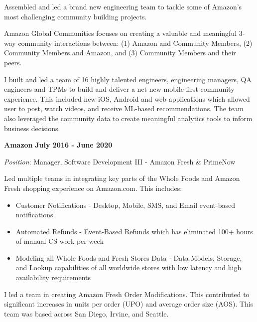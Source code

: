 \documentclass{article}
\begin{document}
Assembled and led a brand new engineering team to tackle some of Amazon's most challenging community building projects.
\vspace{\baselineskip}
\par
Amazon Global Communities focuses on creating a valuable and meaningful 3-way community interactions between: (1) Amazon and Community Members, (2) Community Members and Amazon, and (3) Community Members and their peers.
\vspace{\baselineskip}
\par
I built and led a team of 16 highly talented engineers, engineering managers, QA engineers and TPMs to build and deliver a net-new mobile-first community experience. This included new iOS, Android and web applications which allowed user to post, watch videos, and receive ML-based recommendations. The team also leveraged the community data to create meaningful analytics tools to inform business decisions.
\vspace{\baselineskip}
\par
{\bf Amazon}
\hfill {\bf July 2016 - June 2020}
\vspace{.03in}
\par
{\it Position}: Manager, Software Development III - Amazon Fresh \& PrimeNow\
\vspace{\baselineskip}
\par
Led multiple teams in integrating key parts of the Whole Foods and Amazon Fresh shopping experience on Amazon.com. This includes:
\begin{small}
\begin{itemize}
  \item Customer Notifications - Desktop, Mobile, SMS, and Email event-based notifications
  \item Automated Refunds - Event-Based Refunds which has eliminated 100+ hours of manual CS work per week
  \item Modeling all Whole Foods and Fresh Stores Data - Data Models, Storage, and Lookup capabilities of all worldwide stores with low latency and high availability requirements
\end{itemize}
\end{small}
\par
\vspace{\baselineskip}
I led a team in creating Amazon Fresh Order Modifications.  This contributed to significant increases in units per order (UPO) and average order size (AOS). This team was based across San Diego, Irvine, and Seattle.
\par
\end{document}
